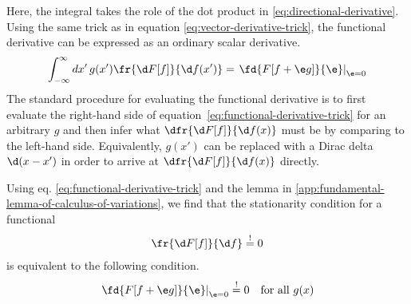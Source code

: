Here, the integral takes the role of the dot product in \ref{eq:directional-derivative}.
Using the same trick as in equation \ref{eq:vector-derivative-trick}, the functional derivative can be expressed as an ordinary scalar derivative.
\begin{align}
\label{eq:functional-derivative-trick}
  \int_{-\infty}^{\infty}
  dx'\,
  g(x')
  \fr{\d F[f]}{\d f(x')}
=
  \left.
  \fd{F[f+\e g]}{\e}
  \right|_{\e=0}
\end{align}
The standard procedure for evaluating the functional derivative is to first evaluate the right-hand side of equation~\ref{eq:functional-derivative-trick} for an arbitrary $g$ and then infer what $\dfr{\d F[f]}{\d f(x)}$ must be by comparing to the left-hand side.
Equivalently, $g(x')$ can be replaced with a Dirac delta $\d(x-x')$ in order to arrive at $\dfr{\d F[f]}{\d f(x)}$ directly.

Using eq. \ref{eq:functional-derivative-trick} and the lemma in \cref{app:fundamental-lemma-of-calculus-of-variations}, we find that the stationarity condition for a functional
\begin{align}
  \fr{\d F[f]}{\d f}
\overset{!}{=}
  0
\end{align}
is equivalent to the following condition.
\begin{align}
  \left.
  \fd{F[f+\e g]}{\e}
  \right|_{\e=0}
\overset{!}{=}
  0
&&
  \text{for all $g(x)$}
\end{align}
